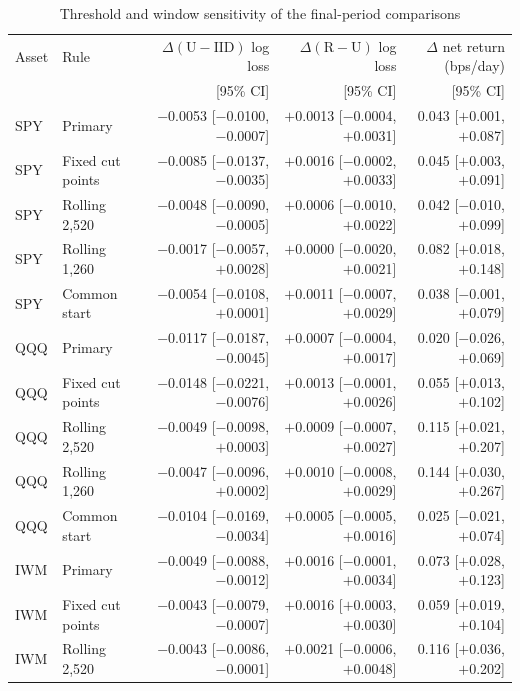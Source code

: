 \begin{table}[!htbp]\centering\footnotesize\setlength{\tabcolsep}{3pt}
\caption{Threshold and window sensitivity of the final-period comparisons}\label{tab:sensitivity}
\begin{tabular}{llrrr}\toprule
Asset & Rule & $\Delta(\mathrm U-\mathrm{IID})$ log loss & $\Delta(\mathrm R-\mathrm U)$ log loss & $\Delta$ net return (bps/day)\\
 & & [95\% CI] & [95\% CI] & [95\% CI]\\\midrule
SPY & Primary & $-$0.0053 [$-$0.0100, $-$0.0007] & $+$0.0013 [$-$0.0004, $+$0.0031] & 0.043 [$+$0.001, $+$0.087]\\
SPY & Fixed cut points & $-$0.0085 [$-$0.0137, $-$0.0035] & $+$0.0016 [$-$0.0002, $+$0.0033] & 0.045 [$+$0.003, $+$0.091]\\
SPY & Rolling 2,520 & $-$0.0048 [$-$0.0090, $-$0.0005] & $+$0.0006 [$-$0.0010, $+$0.0022] & 0.042 [$-$0.010, $+$0.099]\\
SPY & Rolling 1,260 & $-$0.0017 [$-$0.0057, $+$0.0028] & $+$0.0000 [$-$0.0020, $+$0.0021] & 0.082 [$+$0.018, $+$0.148]\\
SPY & Common start & $-$0.0054 [$-$0.0108, $+$0.0001] & $+$0.0011 [$-$0.0007, $+$0.0029] & 0.038 [$-$0.001, $+$0.079]\\
\midrule
QQQ & Primary & $-$0.0117 [$-$0.0187, $-$0.0045] & $+$0.0007 [$-$0.0004, $+$0.0017] & 0.020 [$-$0.026, $+$0.069]\\
QQQ & Fixed cut points & $-$0.0148 [$-$0.0221, $-$0.0076] & $+$0.0013 [$-$0.0001, $+$0.0026] & 0.055 [$+$0.013, $+$0.102]\\
QQQ & Rolling 2,520 & $-$0.0049 [$-$0.0098, $+$0.0003] & $+$0.0009 [$-$0.0007, $+$0.0027] & 0.115 [$+$0.021, $+$0.207]\\
QQQ & Rolling 1,260 & $-$0.0047 [$-$0.0096, $+$0.0002] & $+$0.0010 [$-$0.0008, $+$0.0029] & 0.144 [$+$0.030, $+$0.267]\\
QQQ & Common start & $-$0.0104 [$-$0.0169, $-$0.0034] & $+$0.0005 [$-$0.0005, $+$0.0016] & 0.025 [$-$0.021, $+$0.074]\\
\midrule
IWM & Primary & $-$0.0049 [$-$0.0088, $-$0.0012] & $+$0.0016 [$-$0.0001, $+$0.0034] & 0.073 [$+$0.028, $+$0.123]\\
IWM & Fixed cut points & $-$0.0043 [$-$0.0079, $-$0.0007] & $+$0.0016 [$+$0.0003, $+$0.0030] & 0.059 [$+$0.019, $+$0.104]\\
IWM & Rolling 2,520 & $-$0.0043 [$-$0.0086, $-$0.0001] & $+$0.0021 [$-$0.0006, $+$0.0048] & 0.116 [$+$0.036, $+$0.202]\\

\end{tabular}
\end{table}
